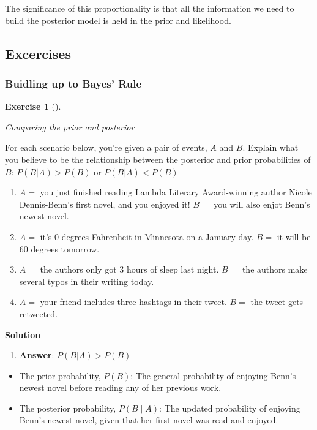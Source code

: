 \documentclass[
  letterpaper,
  DIV=11,
  numbers=noendperiod]{scrartcl}
\providecommand{\tightlist}{%
  \setlength{\itemsep}{0pt}\setlength{\parskip}{0pt}}
\theoremstyle{definition}
\newtheorem{exercise}{Exercise}[section]
\theoremstyle{remark}
\begin{document}
The significance of this proportionality is that all the information we
need to build the posterior model is held in the prior and likelihood.

\pagebreak

\subsection{Excercises}\label{excercises}

\subsubsection{Buidling up to Bayes'
Rule}\label{buidling-up-to-bayes-rule}

\begin{exercise}[]\protect\hypertarget{exr-1_65}{}\label{exr-1_65}

\emph{Comparing the prior and posterior}

For each scenario below, you're given a pair of events, \(A\) and \(B\).
Explain what you believe to be the relationship between the posterior
and prior probabilities of \(B\): \(P(B|A) > P(B)\) or \(P(B|A) < P(B)\)

\begin{enumerate}
\def\labelenumi{\alph{enumi})}
\item
  \(A=\) you just finished reading Lambda Literary Award-winning author
  Nicole Dennis-Benn's first novel, and you enjoyed it! \(B=\) you will
  also enjot Benn's newest novel.
\item
  \(A=\) it's 0 degrees Fahrenheit in Minnesota on a January day. \(B=\)
  it will be 60 degrees tomorrow.
\item
  \(A=\) the authors only got 3 hours of sleep last night. \(B=\) the
  authors make several typos in their writing today.
\item
  \(A=\) your friend includes three hashtags in their tweet. \(B=\) the
  tweet gets retweeted.
\end{enumerate}

\end{exercise}

\textbf{Solution}

\begin{enumerate}
\def\labelenumi{\alph{enumi})}
\tightlist
\item
  \textbf{Answer}: \(P(B|A) > P(B)\)
\end{enumerate}

\begin{itemize}
\item
  The prior probability, \(P(B)\): The general probability of enjoying
  Benn's newest novel before reading any of her previous work.
\item
  The posterior probability, \(P(B∣A)\): The updated probability of
  enjoying Benn's newest novel, given that her first novel was read and
  enjoyed.
\end{itemize}
\end{document}
